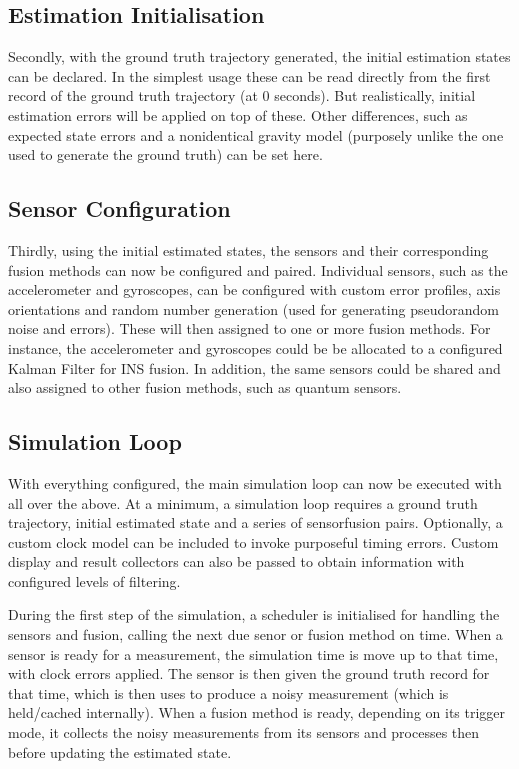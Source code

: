 \documentclass[letterpaper,10pt,english]{sphinxmanual}
\begin{document}
\subsection{Estimation Initialisation}
\label{\detokenize{usage/technical:estimation-initialisation}}
\sphinxAtStartPar
Secondly, with the ground truth trajectory generated, the initial estimation states can be declared. In the simplest
usage these can be read directly from the first record of the ground truth trajectory (at 0 seconds). But
realistically, initial estimation errors will be applied on top of these. Other differences, such as expected
state errors and a non\sphinxhyphen{}identical gravity model (purposely unlike the one used to generate the ground truth)
can be set here.


\subsection{Sensor Configuration}
\label{\detokenize{usage/technical:sensor-configuration}}
\sphinxAtStartPar
Thirdly, using the initial estimated states, the sensors and their corresponding fusion methods can now be
configured and paired. Individual sensors, such as the accelerometer and gyroscopes, can be configured with custom
error profiles, axis orientations and random number generation (used for generating pseudo\sphinxhyphen{}random noise and errors).
These will then assigned to one or more fusion methods. For instance, the accelerometer and gyroscopes could be
be allocated to a configured Kalman Filter for INS fusion. In addition, the same sensors could be shared and also
assigned to other fusion methods, such as quantum sensors.


\subsection{Simulation Loop}
\label{\detokenize{usage/technical:simulation-loop}}
\sphinxAtStartPar
With everything configured, the main simulation loop can now be executed with all over the above. At a minimum, a
simulation loop requires a ground truth trajectory, initial estimated state and a series of sensor\sphinxhyphen{}fusion pairs.
Optionally, a custom clock model can be included to invoke purposeful timing errors. Custom display and result
collectors can also be passed to obtain information with configured levels of filtering.

\sphinxAtStartPar
During the first step of the simulation, a scheduler is initialised for handling the sensors and fusion, calling the
next due senor or fusion method on time. When a sensor is ready for a measurement, the simulation time is move up to
that time, with clock errors applied. The sensor is then given the ground truth record for that time, which is then
uses to produce a noisy measurement (which is held/cached internally). When a fusion method is ready, depending on
its trigger mode, it collects the noisy measurements from its sensors and processes then before updating the
estimated state.
\end{document}
